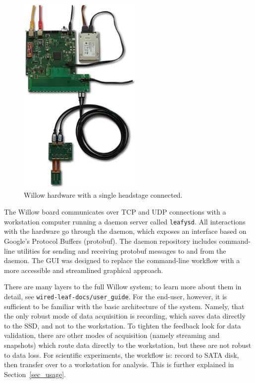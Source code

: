 \begin{figure}[h!]
\begin{center}
\includegraphics[width=6cm]{screenshots/full_setup.png}
\end{center}
\caption{Willow hardware with a single headstage connected.}
\label{fig_hw}
\end{figure}

The Willow board communicates over TCP and UDP connections with a workstation computer running a daemon server called \texttt{leafysd}. All interactions with the hardware go through the daemon, which exposes an interface based on Google's Protocol Buffers (protobuf). The daemon repository includes command-line utilities for sending and receiving protobuf messages to and from the daemon. The GUI was designed to replace the command-line workflow with a more accessible and streamlined graphical approach.

There are many layers to the full Willow system; to learn more about them in detail, see \texttt{wired-leaf-docs/user\_guide}. For the end-user, however, it is sufficient to be familiar with the basic architecture of the system. Namely, that the only robust mode of data acquisition is recording, which saves data directly to the SSD, and not to the workstation. To tighten the feedback look for data validation, there are other modes of acquisition (namely streaming and snapshots) which route data directly to the workstation, but these are not robust to data loss. For scientific experiments, the workflow is: record to SATA disk, then transfer over to a workstation for analysis. This is further explained in Section~\ref{sec_usage}.

